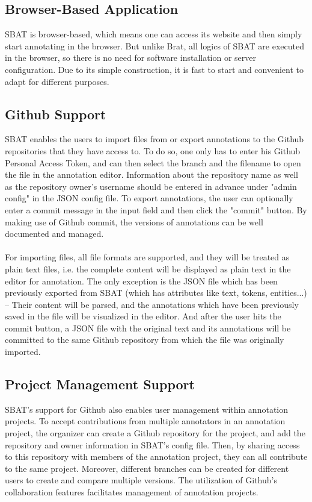\documentclass[12ptm a4paper]{article}
\begin{document}
\subsection{Browser-Based Application}
SBAT is browser-based, which means one can access its website and then simply start annotating in the browser. But unlike Brat, all logics of SBAT are executed in the browser, so there is no need for software installation or server configuration. Due to its simple construction, it is fast to start and convenient to adapt for different purposes.
\subsection{Github Support}
SBAT enables the users to import files from or export annotations to the Github repositories that they have access to. To do so, one only has to enter his Github Personal Access Token, and can then select the branch and the filename to open the file in the annotation editor. Information about the repository name as well as the repository owner's username should be entered in advance under "admin config" in the JSON config file. To export annotations, the user can optionally enter a commit message in the input field and then click the "commit" button. By making use of Github commit, the versions of annotations can be well documented and managed.\\
\\
For importing files, all file formats are supported, and they will be treated as plain text files, i.e. the complete content will be displayed as plain text in the editor for annotation. The only exception is the JSON file which has been previously exported from SBAT (which has attributes like text, tokens, entities...) -- Their content will be parsed, and the annotations which have been previously saved in the file will be visualized in the editor. And after the user hits the commit button, a JSON file with the original text and its annotations will be committed to the same Github repository from which the file was originally imported.
\subsection{Project Management Support}
SBAT's support for Github also enables user management within annotation projects. To accept contributions from multiple annotators in an annotation project, the organizer can create a Github repository for the project, and add the repository and owner information in SBAT's config file. Then, by sharing access to this repository with members of the annotation project, they can all contribute to the same project. Moreover, different branches can be created for different users to create and compare multiple versions. The utilization of Github's collaboration features facilitates management of annotation projects.
\end{document}
